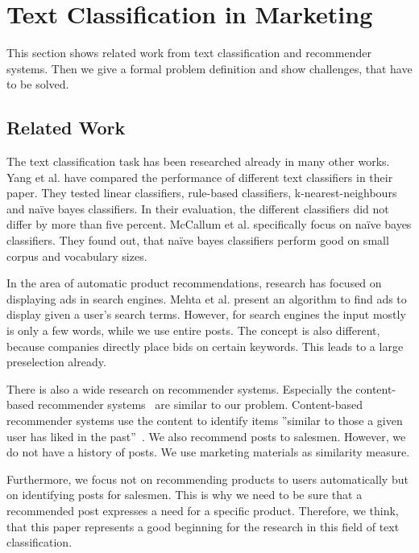 
\section{Text Classification in Marketing}
\label{sec:background}

This section shows related work from text classification and recommender systems.
Then we give a formal problem definition and show challenges, that have to be solved.

\subsection{Related Work}
The text classification task has been researched already in many other works.
Yang et al.\cite{yang1999re} have compared the performance of different text classifiers in their paper.
They tested linear classifiers, rule-based classifiers, k-nearest-neighbours and na\"ive bayes classifiers.
In their evaluation, the different classifiers did not differ by more than five percent.
McCallum et al. \cite{mccallum1998comparison} specifically focus on na\"ive bayes classifiers.
They found out, that na\"ive bayes classifiers perform good on small corpus and vocabulary sizes.

In the area of automatic product recommendations, research has focused on displaying ads in search engines.
Mehta et al.\cite{mehta2007adwords} present an algorithm to find ads to display given a user's search terms.
However, for search engines the input mostly is only a few words, while we use entire posts.
The concept is also different, because companies directly place bids on certain keywords.
This leads to a large preselection already.

There is also a wide research on recommender systems. 
Especially the content-based recommender systems~\cite{lops2011content} are similar to our problem.
Content-based recommender systems use the content to identify items ''similar to those a given user has liked in the past''~\cite{lops2011content}.
We also recommend posts to salesmen.
However, we do not have a history of posts.
We use marketing materials as similarity measure.

Furthermore, we focus not on recommending products to users automatically but on identifying posts for salesmen.
This is why we need to be sure that a recommended post expresses a need for a specific product.
Therefore, we think, that this paper represents a good beginning for the research in this field of text classification.


